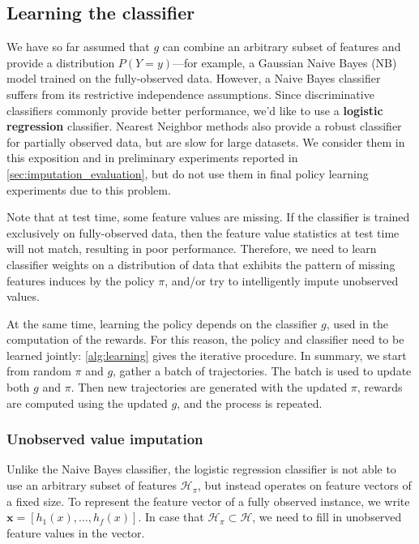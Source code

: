 \subsection{Learning the classifier}\label{sec:clf_classifier}

We have so far assumed that $g$ can combine an arbitrary subset of features and provide a distribution $P(Y = y)$---for example, a Gaussian Naive Bayes (NB) model trained on the fully-observed data.
However, a Naive Bayes classifier suffers from its restrictive independence assumptions.
Since discriminative classifiers commonly provide better performance, we'd like to use a \textbf{logistic regression} classifier.
Nearest Neighbor methods also provide a robust classifier for partially observed data, but are slow for large datasets.
We consider them in this exposition and in preliminary experiments reported in \autoref{sec:imputation_evaluation}, but do not use them in final policy learning experiments due to this problem.

Note that at test time, some feature values are missing.
If the classifier is trained exclusively on fully-observed data, then the feature value statistics at test time will not match, resulting in poor performance.
Therefore, we need to learn classifier weights on a distribution of data that exhibits the pattern of missing features induces by the policy $\pi$, and/or try to intelligently impute unobserved values.



At the same time, learning the policy depends on the classifier $g$, used in the computation of the rewards.
For this reason, the policy and classifier need to be learned jointly: \autoref{alg:learning} gives the iterative procedure.
In summary, we start from random $\pi$ and $g$, gather a batch of trajectories.
The batch is used to update both $g$ and $\pi$.
Then new trajectories are generated with the updated $\pi$, rewards are computed using the updated $g$, and the process is repeated.

\subsubsection{Unobserved value imputation}

Unlike the Naive Bayes classifier, the logistic regression classifier is not able to use an arbitrary subset of features $\mathcal{H}_\pi$, but instead operates on feature vectors of a fixed size.
To represent the feature vector of a fully observed instance, we write $\mathbf{x} = [h_1(x), \dots, h_f(x)]$.
In case that $\mathcal{H}_\pi \subset \mathcal{H}$, we need to fill in unobserved feature values in the vector.


